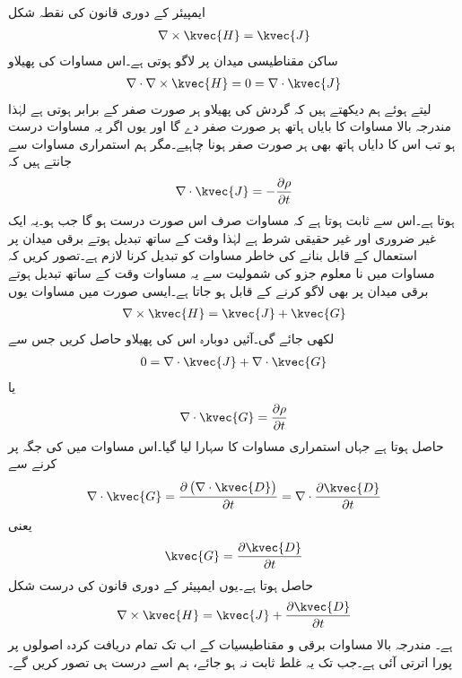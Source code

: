 ایمپیئر کے دوری قانون کی نقطہ شکل
\begin{align}\label{مساوات_میکس_ویل_ایمپیئر_دوری_نقطہ_صورت}
\nabla \times \kvec{H}=\kvec{J}
\end{align}
ساکن مقناطیسی میدان پر لاگو ہوتی ہے۔اس مساوات کی پھیلاو
\begin{align*}
\nabla \cdot \nabla \times \kvec{H}=0=\nabla \cdot \kvec{J}
\end{align*}
 لیتے ہوئے ہم دیکھتے ہیں کہ گردش کی پھیلاو ہر صورت صفر کے برابر ہوتی ہے لہٰذا مندرجہ بالا مساوات کا بایاں ہاتھ ہر صورت صفر دے گا اور یوں اگر یہ مساوات درست ہو تب اس کا دایاں ہاتھ بھی ہر صورت صفر ہونا چاہیے۔مگر ہم استمراری  مساوات سے جانتے ہیں کہ
\begin{align}
\nabla \cdot \kvec{J}=-\frac{\partial \rho}{\partial t}
\end{align} 
ہوتا ہے۔اس سے ثابت ہوتا ہے کہ مساوات  صرف اس صورت درست ہو گا جب  ہو۔یہ ایک غیر ضروری اور غیر حقیقی شرط ہے لہٰذا وقت کے ساتھ تبدیل ہوتے برقی میدان پر استعمال کے قابل بنانے کی خاطر  مساوات  کو تبدیل کرنا لازم ہے۔تصور کریں کہ مساوات  میں نا معلوم جزو  کی شمولیت سے یہ مساوات وقت  کے ساتھ تبدیل ہوتے برقی میدان پر بھی لاگو کرنے کے قابل ہو جاتا ہے۔ایسی صورت میں مساوات  یوں
\begin{align*}
\nabla \times \kvec{H}=\kvec{J}+\kvec{G}
\end{align*}
لکھی جائے گی۔آئیں دوبارہ اس کی پھیلاو حاصل کریں جس سے
\begin{align*}
0=\nabla \cdot \kvec{J}+\nabla \cdot \kvec{G}
\end{align*}
یا
\begin{align*}
\nabla \cdot \kvec{G}=\frac{\partial \rho}{\partial t}
\end{align*}
حاصل ہوتا ہے جہاں استمراری مساوات کا سہارا لیا گیا۔اس مساوات میں  کی جگہ  پر کرنے سے
\begin{align*}
\nabla \cdot \kvec{G}=\frac{\partial \left(\nabla \cdot \kvec{D} \right)}{\partial t}=\nabla \cdot \frac{\partial \kvec{D}}{\partial t}
\end{align*}
یعنی
 \begin{align*}
\kvec{G}=\frac{\partial \kvec{D}}{\partial t}
\end{align*}
حاصل ہوتا ہے۔یوں ایمپیئر کے دوری قانون کی درست شکل
\begin{align}\label{مساوات-میکس_ویل_دوسری_مساوات_نقطہ_شکل}
\nabla \times \kvec{H}=\kvec{J}+\frac{\partial \kvec{D}}{\partial t}
\end{align}
ہے۔ مندرجہ بالا مساوات برقی و مقناطیسیات کے اب تک تمام دریافت کردہ اصولوں پر پورا اترتی آئی ہے۔جب تک یہ غلط ثابت نہ ہو جائے، ہم اسے درست ہی تصور کریں گے۔

